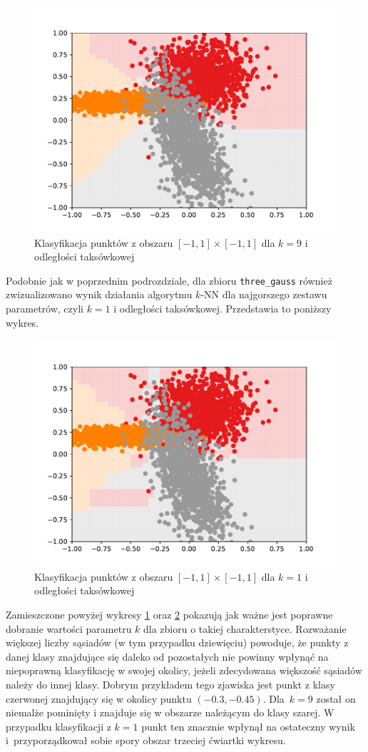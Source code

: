 \documentclass[11pt,a4paper]{article}
\begin{document}
\begin{figure}[H]
  \centering
  \includegraphics[width=.8\textwidth]{res/gauss-manhattan-9.pdf}
  \caption{Klasyfikacja punktów z obszaru $[-1,1] \times [-1,1]$ dla $k = 9$ i odległości taksówkowej}
  \label{fig:gauss-manhattan-9}
\end{figure}

Podobnie jak w poprzednim podrozdziale, dla zbioru {\tt three\_gauss} również zwizualizowano wynik działania algorytmu $k$-NN dla najgorszego zestawu parametrów, czyli $k=1$ i odległości taksówkowej. Przedstawia to poniższy wykres.

\begin{figure}[H]
  \centering
  \includegraphics[width=.8\textwidth]{res/gauss-manhattan-1.pdf}
  \caption{Klasyfikacja punktów z obszaru $[-1,1] \times [-1,1]$ dla $k = 1$ i odległości taksówkowej}
  \label{fig:gauss-manhattan-1}
\end{figure}

Zamieszczone powyżej wykresy \ref{fig:gauss-manhattan-9} oraz \ref{fig:gauss-manhattan-1} pokazują jak ważne jest poprawne dobranie wartości parametru $k$ dla zbioru o takiej charakterstyce. Rozważanie większej liczby sąsiadów (w tym przypadku dziewięciu) powoduje, że punkty z danej klasy znajdujące się daleko od pozostałych nie powinny wpłynąć na niepoprawną klasyfikację w swojej okolicy, jeżeli zdecydowana większość sąsiadów należy do innej klasy. Dobrym przykładem tego zjawiska jest punkt z klasy czerwonej znajdujący się w okolicy punktu $(-0.3, -0.45)$. Dla~$k=9$ został on niemalże pominięty i znajduje się w obszarze należącym do klasy szarej. W przypadku klasyfikacji z $k=1$ punkt ten znacznie wpłynął na ostateczny wynik i~przyporządkował sobie spory obszar trzeciej ćwiartki wykresu.
\end{document}

